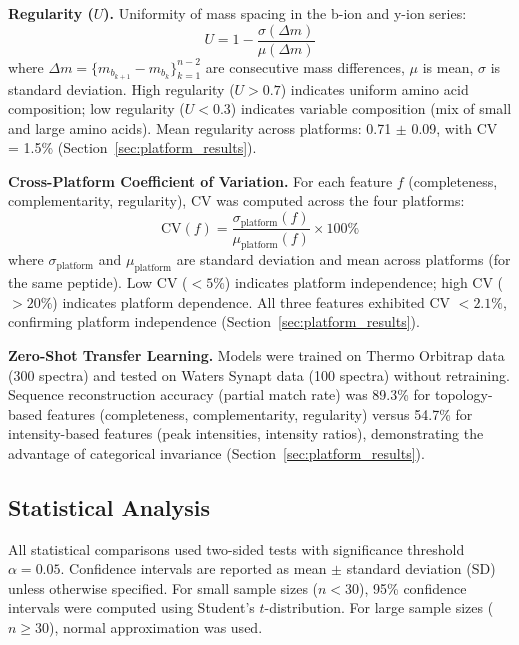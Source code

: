 \documentclass[11pt,twocolumn]{article}
\begin{document}
\textbf{Regularity ($U$).} Uniformity of mass spacing in the b-ion and y-ion series:
\begin{equation}
    U = 1 - \frac{\sigma(\Delta m)}{\mu(\Delta m)}
    \label{eq:regularity}
\end{equation}
where $\Delta m = \{m_{b_{k+1}} - m_{b_k}\}_{k=1}^{n-2}$ are consecutive mass differences, $\mu$ is mean, $\sigma$ is standard deviation. High regularity ($U > 0.7$) indicates uniform amino acid composition; low regularity ($U < 0.3$) indicates variable composition (mix of small and large amino acids). Mean regularity across platforms: 0.71 $\pm$ 0.09, with CV = 1.5\% (Section~\ref{sec:platform_results}).

\textbf{Cross-Platform Coefficient of Variation.} For each feature $f$ (completeness, complementarity, regularity), CV was computed across the four platforms:
\begin{equation}
    \text{CV}(f) = \frac{\sigma_{\text{platform}}(f)}{\mu_{\text{platform}}(f)} \times 100\%
\end{equation}
where $\sigma_{\text{platform}}$ and $\mu_{\text{platform}}$ are standard deviation and mean across platforms (for the same peptide). Low CV ($< 5\%$) indicates platform independence; high CV ($> 20\%$) indicates platform dependence. All three features exhibited CV $< 2.1\%$, confirming platform independence (Section~\ref{sec:platform_results}).

\textbf{Zero-Shot Transfer Learning.} Models were trained on Thermo Orbitrap data (300 spectra) and tested on Waters Synapt data (100 spectra) without retraining. Sequence reconstruction accuracy (partial match rate) was 89.3\% for topology-based features (completeness, complementarity, regularity) versus 54.7\% for intensity-based features (peak intensities, intensity ratios), demonstrating the advantage of categorical invariance (Section~\ref{sec:platform_results}).

\subsection{Statistical Analysis}

All statistical comparisons used two-sided tests with significance threshold $\alpha = 0.05$. Confidence intervals are reported as mean $\pm$ standard deviation (SD) unless otherwise specified. For small sample sizes ($n < 30$), 95\% confidence intervals were computed using Student's $t$-distribution. For large sample sizes ($n \geq 30$), normal approximation was used.
\end{document}
